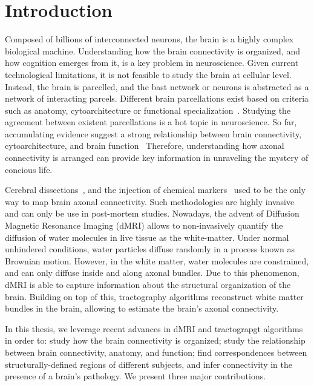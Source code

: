 \chapter{Introduction}

Composed of billions of interconnected neurons, the brain is a highly complex
biological machine. Understanding how the brain connectivity is organized,
and how cognition emerges from it, is a key problem in neuroscience. Given
current technological limitations, it is not feasible to study the brain at
cellular level. Instead, the brain is parcelled, and the bast network or neurons
is abstracted as a network of interacting parcels. Different brain parcellations
exist based on criteria such as anatomy, cytoarchitecture or functional
specialization~\cite{Brodmann1909, Collins1998, Yeo2011}. Studying the
agreement between existent parcellations is a hot topic in neuroscience.
So far, accumulating evidence suggest a strong relationship between brain
connectivity, cytoarchitecture, and brain function~\citep{Passingham2002, Johansen-Berg2004, Honey2009, Eickhoff2010}
Therefore, understanding how axonal connectivity is arranged can provide key
information in unraveling the mystery of concious life.

Cerebral dissections~\cite{Meynert1872, Brodmann1909, Gray1918},
and the injection of chemical markers~\cite{Schmahmann2006, Stephan2013} used to
be the only way to map brain axonal connectivity. Such methodologies are highly
invasive and can only be use in post-mortem studies. Nowadays, the advent of
Diffusion Magnetic Resonance Imaging (dMRI) allows to non-invasively quantify
the diffusion of water molecules in live tissue as the white-matter. Under
normal unhindered conditions, water particles diffuse randomly in a process
known as Brownian motion. However, in the white matter, water molecules are
constrained, and can only diffuse inside and along axonal bundles. Due to this
phenomenon, dMRI is able to capture information about the structural organization
of the brain. Building on top of this, tractography algorithms reconstruct
white matter bundles in the brain, allowing to estimate the brain's axonal
connectivity.


In this thesis, we leverage recent advances in dMRI and tractograpgt algorithms
in order to: study how the brain connectivity is organized; study the relationship
between brain connectivity, anatomy, and function; find correspondences between 
structurally-defined regions of different subjects, and infer connectivity in
the presence of a brain’s pathology. We present three major contributions.

